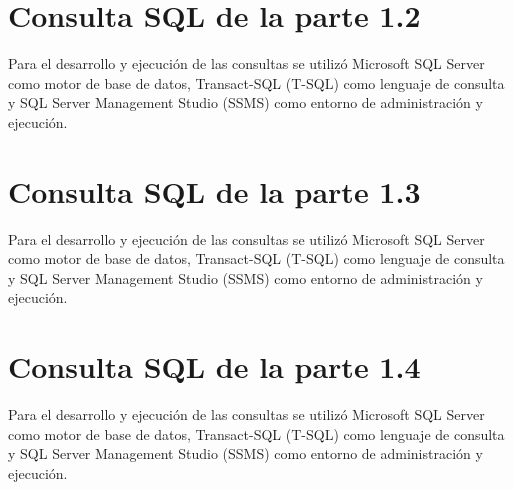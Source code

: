 \documentclass[12pt,a4paper]{article}
\begin{document}
		\begin{tcolorbox}[colback = main!40, colframe = main!40]
			
		\end{tcolorbox}
		
	\section{Consulta SQL de la parte 1.2}\label{anexo 3}
		
		\noindent Para el desarrollo y ejecución de las consultas se utilizó Microsoft SQL Server como motor
		de base de datos, Transact-SQL (T-SQL) como lenguaje de consulta y SQL Server Management Studio (SSMS)
		como entorno de administración y ejecución.
		
		\begin{tcolorbox}[colback = main!40, colframe = main!40]
			
		\end{tcolorbox}
		
	\section{Consulta SQL de la parte 1.3}\label{anexo 4}
		
		\noindent Para el desarrollo y ejecución de las consultas se utilizó Microsoft SQL Server como motor
		de base de datos, Transact-SQL (T-SQL) como lenguaje de consulta y SQL Server Management Studio (SSMS)
		como entorno de administración y ejecución.
		
		\begin{tcolorbox}[colback = main!40, colframe = main!40]
			
		\end{tcolorbox}
	
	\section{Consulta SQL de la parte 1.4}\label{anexo 5}
		
		\noindent Para el desarrollo y ejecución de las consultas se utilizó Microsoft SQL Server como motor
		de base de datos, Transact-SQL (T-SQL) como lenguaje de consulta y SQL Server Management Studio (SSMS)
		como entorno de administración y ejecución.
		
\end{document}
